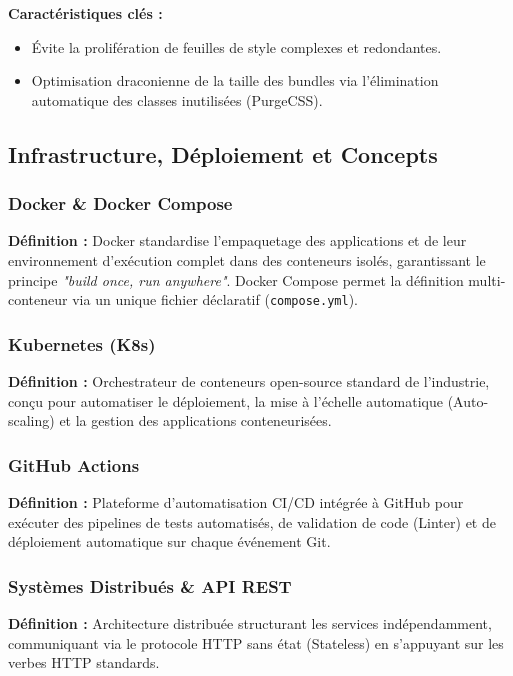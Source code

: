 \documentclass[a4paper,12pt]{article}
\begin{document}
\textbf{Caractéristiques clés :}
\begin{itemize}[label=$\bullet$]
    \item Évite la prolifération de feuilles de style complexes et redondantes.
    \item Optimisation draconienne de la taille des bundles via l'élimination automatique des classes inutilisées (PurgeCSS).
\end{itemize}

\subsection{Infrastructure, Déploiement et Concepts}

\subsubsection{Docker \& Docker Compose}
\textbf{Définition :} Docker standardise l'empaquetage des applications et de leur environnement d'exécution complet dans des conteneurs isolés, garantissant le principe \textit{"build once, run anywhere"}. Docker Compose permet la définition multi-conteneur via un unique fichier déclaratif (\texttt{compose.yml}).

\subsubsection{Kubernetes (K8s)}
\textbf{Définition :} Orchestrateur de conteneurs open-source standard de l'industrie, conçu pour automatiser le déploiement, la mise à l'échelle automatique (Auto-scaling) et la gestion des applications conteneurisées.

\subsubsection{GitHub Actions}
\textbf{Définition :} Plateforme d'automatisation CI/CD intégrée à GitHub pour exécuter des pipelines de tests automatisés, de validation de code (Linter) et de déploiement automatique sur chaque événement Git.

\subsubsection{Systèmes Distribués \& API REST}
\textbf{Définition :} Architecture distribuée structurant les services indépendamment, communiquant via le protocole HTTP sans état (Stateless) en s'appuyant sur les verbes HTTP standards.
\end{document}
